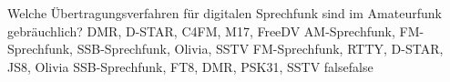     {Welche Übertragungsverfahren für digitalen Sprechfunk sind im Amateurfunk gebräuchlich?}
    {DMR, D-STAR, C4FM, M17, FreeDV}
    {AM-Sprechfunk, FM-Sprechfunk, SSB-Sprechfunk, Olivia, SSTV}
    {FM-Sprechfunk, RTTY, D-STAR, JS8, Olivia}
    {SSB-Sprechfunk, FT8, DMR, PSK31, SSTV}
    {false}{false}